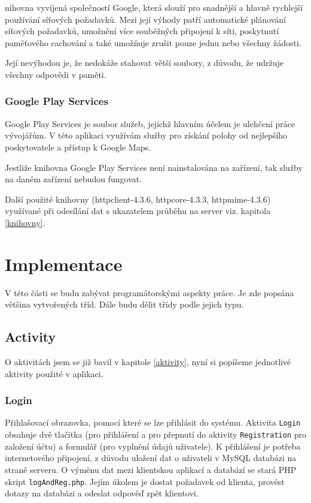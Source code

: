 \documentclass[12pt]{article}
\begin{document}
nihovna vyvíjená společností Google, která slouží pro snadnější a hlavně rychlejší používání síťových požadavků. Mezi její výhody patří automatické plánování síťových požadavků, umožnění více souběžných připojení k síti, poskytnutí paměťového cachování a také umožňuje zrušit pouze jednu nebo všechny žádosti.

Její nevýhodou je, že nedokáže stahovat větší soubory, z důvodu, že udržuje všechny odpovědi v paměti.\cite{volley}
\subsubsection{Google Play Services}
Google Play Services je soubor služeb, jejichž hlavním účelem je ulehčení práce vývojářům. V této aplikaci využívám služby pro získání polohy od nejlepšího poskytovatele a přístup k Google Maps.

Jestliže knihovna Google Play Services není nainstalována na zařízení, tak služby na daném zařízení nebudou fungovat.\cite{services}


Další použité knihovny (httpclient-4.3.6, httpcore-4.3.3, httpmime-4.3.6) využívané při odesílání dat s ukazatelem průběhu na server viz. kapitola \ref{knihovny}.
\newpage
\section{Implementace}
V této části se budu zabývat programátorskými aspekty práce. Je zde popsána většina vytvořených tříd. Dále budu dělit třídy podle jejich typu.
\subsection{Activity}
O aktivitách jsem se již bavil v kapitole \ref{aktivity}, nyní si popíšeme jednotlivé aktivity použité v aplikaci.
\subsubsection{Login}
Přihlašovací obrazovka, pomocí které se lze přihlásit do systému. Aktivita \verb+Login+ obsahuje dvě tlačítka (pro přihlášení a pro přepnutí do aktivity \verb+Registration+ pro založení účtu) a formulář (pro vyplnění údajů uživatele). K přihlášení je potřeba internetového připojení, z důvodu uložení dat o uživateli v MySQL databázi na straně serveru. O výměnu dat mezi klientskou aplikací a databází se stará PHP skript \verb+logAndReg.php+. Jejím úkolem je dostat požadavek od klienta, provést dotazy na databázi a odeslat odpověď zpět klientovi.
\end{document}
